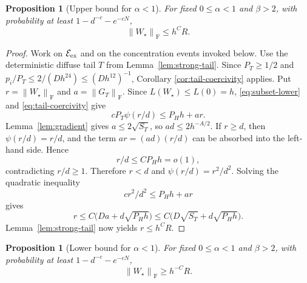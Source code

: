\documentclass[11pt]{article}
\newtheorem{proposition}[theorem]{Proposition}
\theoremstyle{remark}
\newcommand{\norm}[1]{\left\lVert #1\right\rVert}
\newcommand{\F}{\mathrm{F}}
\newcommand{\1}{\mathbf 1}
\begin{document}
\begin{proposition}[Upper bound for $\alpha<1$]
\label{prop:alpha-less-upper}
For fixed $0\leq\alpha<1$ and $\beta>2$, with probability at least
$1-d^{-c}-e^{-cN}$,
\[
 \norm{W_\star}_{\F}\leq h^C R.
\]
\end{proposition}

\begin{proof}
Work on $\mathcal E_{\rm ex}$ and on the concentration events invoked
below.  Use the deterministic diffuse tail $T$ from
Lemma~\ref{lem:strong-tail}.  Since $P_T\geq1/2$ and
$p_i/P_T\leq2/(Dh^{24})\leq(Dh^{12})^{-1}$, Corollary
\ref{cor:tail-coercivity} applies.  Put
$r=\norm{W_\star}_{\F}$ and $a=\norm{G_T}_{\F}$.  Since
$L(W_\star)\leq L(0)=h$, \eqref{eq:subset-lower} and
\eqref{eq:tail-coercivity} give
\begin{equation}
 cP_T\psi(r/d)\leq P_Hh+ar.
 \label{eq:upper-master}
\end{equation}
Lemma~\ref{lem:gradient} gives $a\leq2\sqrt{S_T}$, so
$ad\leq2h^{-A/2}$.  If $r\geq d$, then
$\psi(r/d)=r/d$, and the term $ar=(ad)(r/d)$ can be absorbed into the
left-hand side.  Hence
\[
 r/d\leq CP_Hh=o(1),
\]
contradicting $r/d\geq1$.  Therefore $r<d$ and
$\psi(r/d)=r^2/d^2$.  Solving the quadratic inequality
\[
 cr^2/d^2\leq P_Hh+ar
\]
gives
\[
 r\leq C\bigl(Da+d\sqrt{P_Hh}\bigr)
 \leq C\bigl(D\sqrt{S_T}+d\sqrt{P_Hh}\bigr).
\]
Lemma~\ref{lem:strong-tail} now yields $r\leq h^CR$.
\end{proof}

\begin{proposition}[Lower bound for $\alpha<1$]
\label{prop:alpha-less-lower}
For fixed $0\leq\alpha<1$ and $\beta>2$, with probability at least
$1-d^{-c}-e^{-cN}$,
\[
 \norm{W_\star}_{\F}\geq h^{-C}R.
\]
\end{proposition}
\end{document}
